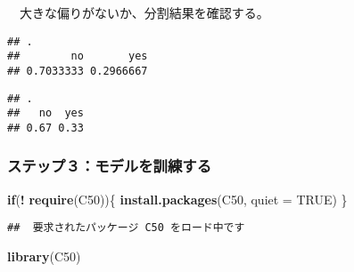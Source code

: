 \documentclass[
]{article}
\newenvironment{Shaded}{\begin{snugshade}}{\end{snugshade}}
\newcommand{\AttributeTok}[1]{\textcolor[rgb]{0.13,0.29,0.53}{#1}}
\newcommand{\ConstantTok}[1]{\textcolor[rgb]{0.56,0.35,0.01}{#1}}
\newcommand{\ControlFlowTok}[1]{\textcolor[rgb]{0.13,0.29,0.53}{\textbf{#1}}}
\newcommand{\FunctionTok}[1]{\textcolor[rgb]{0.13,0.29,0.53}{\textbf{#1}}}
\newcommand{\NormalTok}[1]{#1}
\newcommand{\SpecialCharTok}[1]{\textcolor[rgb]{0.81,0.36,0.00}{\textbf{#1}}}
\newcommand{\StringTok}[1]{\textcolor[rgb]{0.31,0.60,0.02}{#1}}
\begin{document}
　大きな偏りがないか、分割結果を確認する。

\begin{Shaded}
\end{Shaded}

\begin{verbatim}
## .
##        no       yes 
## 0.7033333 0.2966667
\end{verbatim}

\begin{Shaded}
\end{Shaded}

\begin{verbatim}
## .
##   no  yes 
## 0.67 0.33
\end{verbatim}

\subsubsection{ステップ３：モデルを訓練する}\label{ux30b9ux30c6ux30c3ux30d7uxff13ux30e2ux30c7ux30ebux3092ux8a13ux7df4ux3059ux308b}

\begin{Shaded}
\begin{Highlighting}[]
\ControlFlowTok{if}\NormalTok{(}\SpecialCharTok{!} \FunctionTok{require}\NormalTok{(C50))\{}
    \FunctionTok{install.packages}\NormalTok{(}\StringTok{\textquotesingle{}C50\textquotesingle{}}\NormalTok{, }\AttributeTok{quiet =} \ConstantTok{TRUE}\NormalTok{)}
\NormalTok{\}}
\end{Highlighting}
\end{Shaded}

\begin{verbatim}
##  要求されたパッケージ C50 をロード中です
\end{verbatim}

\begin{Shaded}
\begin{Highlighting}[]
\FunctionTok{library}\NormalTok{(C50)}
\end{Highlighting}
\end{Shaded}
\end{document}
